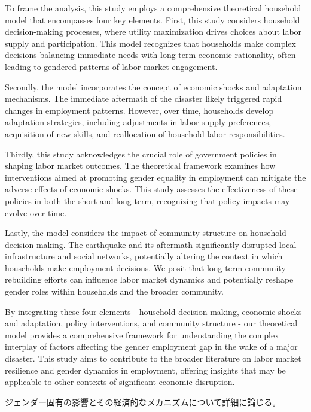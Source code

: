 \documentclass[12pt,halfline,a4paper]{ouparticle}
\begin{document}
To frame the analysis, this study employs a comprehensive theoretical household model that encompasses four key elements. First, this study considers household decision-making processes, where utility maximization drives choices about labor supply and participation. This model recognizes that households make complex decisions balancing immediate needs with long-term economic rationality, often leading to gendered patterns of labor market engagement.

Secondly, the model incorporates the concept of economic shocks and adaptation mechanisms. The immediate aftermath of the disaster likely triggered rapid changes in employment patterns. However, over time, households develop adaptation strategies, including adjustments in labor supply preferences, acquisition of new skills, and reallocation of household labor responsibilities.

Thirdly, this study acknowledges the crucial role of government policies in shaping labor market outcomes. The theoretical framework examines how interventions aimed at promoting gender equality in employment can mitigate the adverse effects of economic shocks. This study assesses the effectiveness of these policies in both the short and long term, recognizing that policy impacts may evolve over time.

Lastly, the model considers the impact of community structure on household decision-making. The earthquake and its aftermath significantly disrupted local infrastructure and social networks, potentially altering the context in which households make employment decisions. We posit that long-term community rebuilding efforts can influence labor market dynamics and potentially reshape gender roles within households and the broader community.

By integrating these four elements - household decision-making, economic shocks and adaptation, policy interventions, and community structure - our theoretical model provides a comprehensive framework for understanding the complex interplay of factors affecting the gender employment gap in the wake of a major disaster. This study aims to contribute to the broader literature on labor market resilience and gender dynamics in employment, offering insights that may be applicable to other contexts of significant economic disruption.



ジェンダー固有の影響とその経済的なメカニズムについて詳細に論じる。
\end{document}
